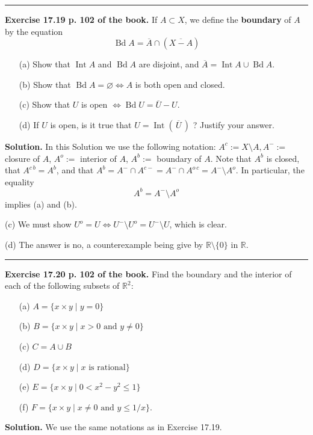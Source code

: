 \documentclass[12pt,letterpaper]{article}
\newcommand{\hs}{\bigskip\hrule\medskip}
\newcommand{\noi}{\noindent}%
\newcommand{\sm}{\setminus}
\newcommand{\R}{\mathbb R}
\begin{document}
\hs

\noi\textbf{Exercise 17.19 p. 102 of the book.} If $A\subset X$, we define the \textbf{boundary} of $A$ by the equation
$$
\operatorname{Bd}A=\overline{A}\cap(\overline{X-A})
$$
\begin{enumerate}
    \item[(a)] Show that $\operatorname{Int} A$ and $\operatorname{Bd} A$ are disjoint, and $\overline{A}=\operatorname{Int}A\cup\operatorname{Bd}A$.
    \item[(b)] Show that $\operatorname{Bd}A=\varnothing\Leftrightarrow A$ is both open and closed.
    \item[(c)] Show that $U$ is open $\Leftrightarrow\operatorname{Bd} U=\overline{U}-U$.
    \item[(d)] If $U$ is open, is it true that $U=\operatorname{Int}(\,\overline{U}\,)$ ? Justify your answer.
\end{enumerate}

\noi\textbf{Solution.} In this Solution we use the following notation: $A^c:=X\sm A,A^-:=$ closure of $A$, $A^o:=$ interior of $A$, $A^b:=$ boundary of $A$. Note that $A^b$ is closed, that $A^{c\,b}=A^b$, and that $A^b=A^-\cap A^{c-}=A^-\cap A^{o\,c}=A^-\sm A^o$. In particular, the equality 
$$
A^b=A^-\sm A^o
$$ 
implies (a) and (b). 

\noi(c) We must show $U^o=U\Leftrightarrow U^-\sm U^o=U^-\sm U$, which is clear. 

\noi(d) The answer is no, a counterexample being give by $\R\sm\{0\}$ in $\R$. 

\hs

\noi\textbf{Exercise 17.20 p. 102 of the book.} Find the boundary and the interior of each of the following subsets of $\mathbb{R}^{2}$:
\begin{enumerate}
    \item[(a)] $A=\{x\times y\mid y=0\}$
    \item[(b)] $B=\{x\times y\mid x>0\text{ and }y\ne0\}$
    \item[(c)] $C=A\cup B$
    \item[(d)] $D=\{x\times y\mid x\text{ is rational}\}$
    \item[(e)] $E=\{x\times y\mid 0<x^2-y^2\le1\}$
    \item[(f)] $F=\{x\times y\mid x\ne0\text{ and }y\leq1/x\}$. 
\end{enumerate}

\noi\textbf{Solution.} We use the same notations as in Exercise 17.19. 
\end{document}
